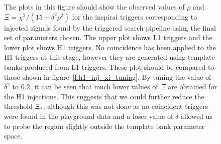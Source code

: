 \begin{figure}[p]
{\label{f:h1_inj_xi_final}%
The plots in this figure should show the observed values of $\rho$ and $\Xi
= \chi^2/(15 + \delta^2\rho^2)$ for the inspiral triggers corresponding to
injected signals found by the triggered search pipeline using the final set of
parameters chosen. The upper plot shows L1 triggers and the lower plot shows
H1 triggers. No coincidence has been applied to the H1 triggers at this stage,
however they are generated using template banks produced from L1 triggers.
These plot should be compared to those shown in
figure~\ref{f:h1_inj_xi_tuning}. By tuning the value of $\delta^2$ to $0.2$,
it can be seen that much lower values of $\Xi$ are obtained for the H1
injections. This suggests that we could further reduce the threshold
$\Xi_\ast$, although this was not done as no coincident triggers were found in
the playground data and a loser value of $\delta$ allowed us to probe the
region slightly outside the template bank parameter space.
}
\end{figure}


